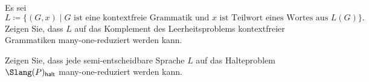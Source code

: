 \documentclass[german]{latteachCD}[2017/03/28]
\begin{document}
\begin{exercise}
  Es sei
  \begin{equation*}
    L \coloneqq \{(G,x) \mid G \text{ ist eine kontextfreie Grammatik und $x$ ist
      Teilwort eines Wortes aus } L(G)\}.
  \end{equation*}
  Zeigen Sie, dass $L$ auf das Komplement des Leerheitsproblems kontextfreier
  Grammatiken many-one-reduziert werden kann.

\end{exercise}

\begin{exercise}
  Zeigen Sie, dass jede semi-entscheidbare Sprache $L$ auf das Halteproblem
  $\Slang(P)_{\mathsf{halt}}$ many-one-reduziert werden kann.
\end{exercise}
\end{document}
